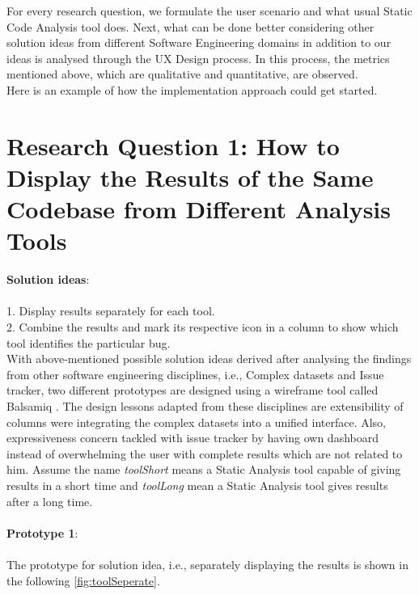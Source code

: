 For every research question, we formulate the user scenario and what usual Static Code Analysis tool does. Next, what can be done better considering other solution ideas from different Software Engineering domains in addition to our ideas is analysed through the UX Design process. In this process, the metrics mentioned above, which are qualitative and quantitative, are observed. \\

Here is an example of how the implementation approach could get started.

\section{Research Question 1: How to Display the Results of the Same Codebase from Different Analysis Tools}

\textbf{Solution ideas}: \\ \\
1. Display results separately for each tool. \\
2. Combine the results and mark its respective icon in a column to show which tool identifies the particular bug. \\

With above-mentioned possible solution ideas derived after analysing the findings from other software engineering disciplines, i.e., Complex datasets and Issue tracker, two different prototypes are designed using a wireframe tool called Balsamiq \cite{B}. The design lessons adapted from these disciplines are extensibility of columns were integrating the complex datasets into a unified interface. Also, expressiveness concern tackled with issue tracker by having own dashboard instead of overwhelming the user with complete results which are not related to him. Assume the name \textit{toolShort} means a Static Analysis tool capable of giving results in a short time and \textit{toolLong} mean a Static Analysis tool gives results after a long time. \\ \\

\textbf{Prototype 1}: \\ \\

The prototype for solution idea, i.e., separately displaying the results is shown in the following \autoref{fig:toolSeperate}. \\ 

